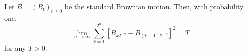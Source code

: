 Let $B = (B_t)_{t \geq 0}$ be the standard Brownian motion. Then, with probability one,
$$
\lim_{n \to \infty} \sum_{k=1}^{2^n} \left[ B_{k2^{-n}} - B_{(k-1)2^{-n}} \right]^2 = T
$$
for any $T > 0$.
